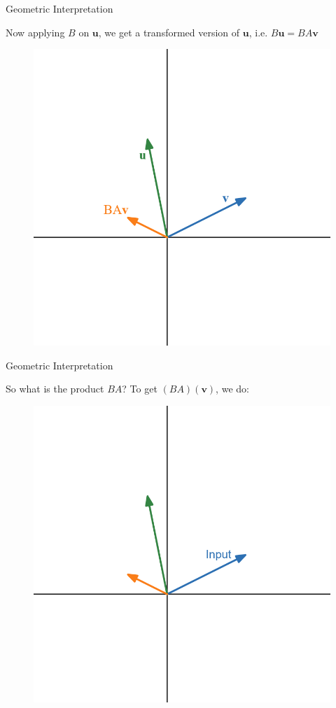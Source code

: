 \documentclass{beamer}
\begin{document}
\begin{frame}{Geometric Interpretation }

Now  applying $B$ on $\mathbf{u} $, we get a  transformed version of $\mathbf{u} $, i.e. $B\mathbf{u}=BA\mathbf{v}$

\begin{figure}
    \centering
    \includegraphics[width=0.5\linewidth]{matrix product/desmos-graph (5).png}
\end{figure}    
\end{frame}


\begin{frame}{Geometric Interpretation }

So what is the product $BA$? To get $(BA)(\mathbf{v})$, we do:

\begin{figure}
    \centering
    \includegraphics[width=0.5\linewidth]{matrix product/desmos-graph (6).png}
\end{figure}    
\end{frame}
\end{document}
